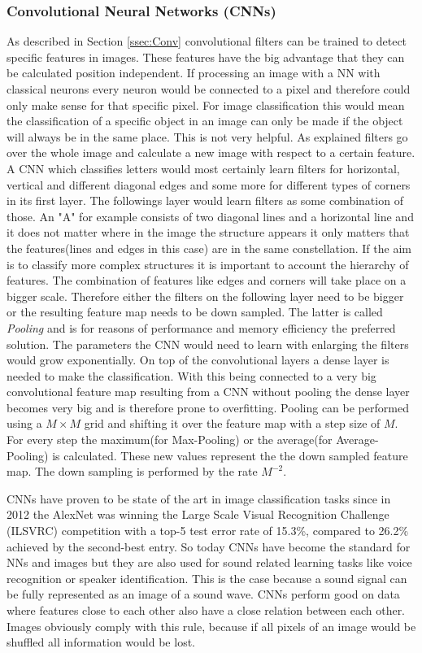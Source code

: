 \subsubsection{Convolutional Neural Networks (CNNs)}\label{ssec:convNets}
As described in Section \ref{ssec:Conv} convolutional filters can be trained to detect specific features in images.
These features have the big advantage that they can be calculated position independent.
If processing an image with a NN with classical neurons every neuron would be connected to a pixel and therefore could only make sense for that specific pixel.
For image classification this would mean the classification of a specific object in an image can only be made if the object will always be in the same place. This is not very helpful.
As explained filters go over the whole image and calculate a new image with respect to a certain feature.
A CNN which classifies letters would most certainly learn filters for horizontal, vertical and different diagonal edges and some more for different types of corners in its first layer.
The followings layer would learn filters as some combination of those. An "A" for example consists of two diagonal lines and a horizontal line and it does not matter where in the image the structure appears it only matters that the features(lines and edges in this case) are in the same constellation.
If the aim is to classify more complex structures it is important to account the hierarchy of features.
The combination of features like edges and corners will take place on a bigger scale.
Therefore either the filters on the following layer need to be bigger or the resulting feature map needs to be down sampled.
The latter is called \emph{Pooling} and is for reasons of performance and memory efficiency the preferred solution.
The parameters the CNN would need to learn with enlarging the filters would grow exponentially.
On top of the convolutional layers a dense layer is needed to make the classification. 
With this being connected to a very big convolutional feature map resulting from a CNN without pooling the dense layer becomes very big and is therefore prone to overfitting.
Pooling can be performed using a $M \times M$ grid and shifting it over the feature map with a step size of $M$. For every step the maximum(for Max-Pooling) or the average(for Average-Pooling) is calculated. 
These new values represent the the down sampled feature map. 
The down sampling is performed by the rate $M^{-2}$.

CNNs have proven to be state of the art in image classification tasks since in 2012 the AlexNet was winning the Large Scale Visual Recognition Challenge (ILSVRC) \cite{ILSVRC} competition with a top-5 test error rate of 15.3\%,
compared to 26.2\% achieved by the second-best entry.\cite{NIPS2012_4824}
So today CNNs have become the standard for NNs and images but they are also used for sound related learning tasks like voice recognition or speaker identification.
This is the case because a sound signal can be fully represented as an image of a sound wave.
CNNs perform good on data where features close to each other also have a close relation between each other.
Images obviously comply with this rule, because if all pixels of an image would be shuffled all information would be lost.
